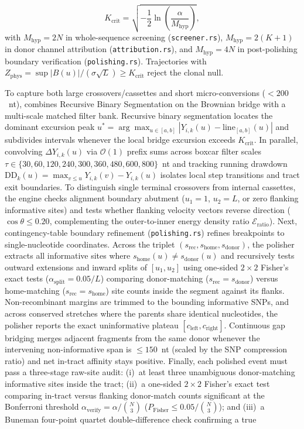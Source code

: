 \begin{equation}
K_{\text{crit}} = \sqrt{-\frac{1}{2} \ln \left( \frac{\alpha}{M_{\text{hyp}}} \right)},
\label{eq:methods_k_crit}
\end{equation}
with $M_{\text{hyp}} = 2N$ in whole-sequence screening (\texttt{screener.rs}), $M_{\text{hyp}} = 2(K + 1)$ in donor channel attribution (\texttt{attribution.rs}), and $M_{\text{hyp}} = 4N$ in post-polishing boundary verification (\texttt{polishing.rs}). Trajectories with $Z_{\mathrm{phys}} = \sup |B(u)| / (\sigma \sqrt{L}) \ge K_{\text{crit}}$ reject the clonal null.

To capture both large crossovers/cassettes and short micro-conversions ($< 200$~nt), \RhizAeon combines Recursive Binary Segmentation on the Brownian bridge with a multi-scale matched filter bank. Recursive binary segmentation locates the dominant excursion peak $u^* = \arg\max_{u \in [a, b]} |Y_{i,k}(u) - \text{line}_{[a,b]}(u)|$ and subdivides intervals whenever the local bridge excursion exceeds $K_{\text{crit}}$. In parallel, convolving $\Delta Y_{i,k}(u)$ via $\mathcal{O}(1)$ prefix sums across boxcar filter scales $\tau \in \{30, 60, 120, 240, 300, 360, 480, 600, 800\}$~nt and tracking running drawdown $\text{DD}_k(u) = \max_{v \le u} Y_{i,k}(v) - Y_{i,k}(u)$ isolates local step transitions and tract exit boundaries. To distinguish single terminal crossovers from internal cassettes, the engine checks alignment boundary abutment ($u_1 = 1$, $u_2 = L$, or zero flanking informative sites) and tests whether flanking velocity vectors reverse direction ($\cos\theta \le 0.20$, complementing the outer-to-inner energy density ratio $\mathcal{E}_{\text{ratio}}$). Next, contingency-table boundary refinement (\texttt{polishing.rs}) refines breakpoints to single-nucleotide coordinates. Across the triplet $(s_{\text{rec}}, s_{\text{home}}, s_{\text{donor}})$, the polisher extracts all informative sites where $s_{\text{home}}(u) \neq s_{\text{donor}}(u)$ and recursively tests outward extensions and inward splits of $[u_1, u_2]$ using one-sided $2\times 2$ Fisher's exact tests ($\alpha_{\mathrm{split}} = 0.05 / L$) comparing donor-matching ($s_{\text{rec}} = s_{\text{donor}}$) versus home-matching ($s_{\text{rec}} = s_{\text{home}}$) site counts inside the segment against its flanks. Non-recombinant margins are trimmed to the bounding informative SNPs, and across conserved stretches where the parents share identical nucleotides, the polisher reports the exact uninformative plateau $[c_{\text{left}}, c_{\text{right}}]$. Continuous gap bridging merges adjacent fragments from the same donor whenever the intervening non-informative span is $\le 150$~nt (scaled by the SNP compression ratio) and net in-tract affinity stays positive. Finally, each polished event must pass a three-stage raw-site audit: (i)~at least three unambiguous donor-matching informative sites inside the tract; (ii)~a one-sided $2\times 2$ Fisher's exact test comparing in-tract versus flanking donor-match counts significant at the Bonferroni threshold $\alpha_{\mathrm{verify}} = \alpha / \binom{N}{3}$ ($P_{\mathrm{Fisher}} \le 0.05 / \binom{N}{3}$); and (iii)~a Buneman four-point quartet double-difference check \citep{buneman1974note} confirming a true 